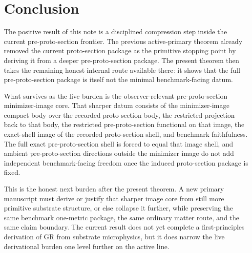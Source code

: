 \documentclass[11pt]{article}
\begin{document}
\section{Conclusion}

The positive result of this note is a disciplined compression step inside the current pre-proto-section frontier. The previous active-primary theorem already removed the current proto-section package as the primitive stopping point by deriving it from a deeper pre-proto-section package. The present theorem then takes the remaining honest internal route available there: it shows that the full pre-proto-section package is itself not the minimal benchmark-facing datum.

What survives as the live burden is the observer-relevant pre-proto-section minimizer-image core. That sharper datum consists of the minimizer-image compact body over the recorded proto-section body, the restricted projection back to that body, the restricted pre-proto-section functional on that image, the exact-shell image of the recorded proto-section shell, and benchmark faithfulness. The full exact pre-proto-section shell is forced to equal that image shell, and ambient pre-proto-section directions outside the minimizer image do not add independent benchmark-facing freedom once the induced proto-section package is fixed.

This is the honest next burden after the present theorem. A new primary manuscript must derive or justify that sharper image core from still more primitive substrate structure, or else collapse it further, while preserving the same benchmark one-metric package, the same ordinary matter route, and the same claim boundary. The current result does not yet complete a first-principles derivation of GR from substrate microphysics, but it does narrow the live derivational burden one level further on the active line.
\end{document}
